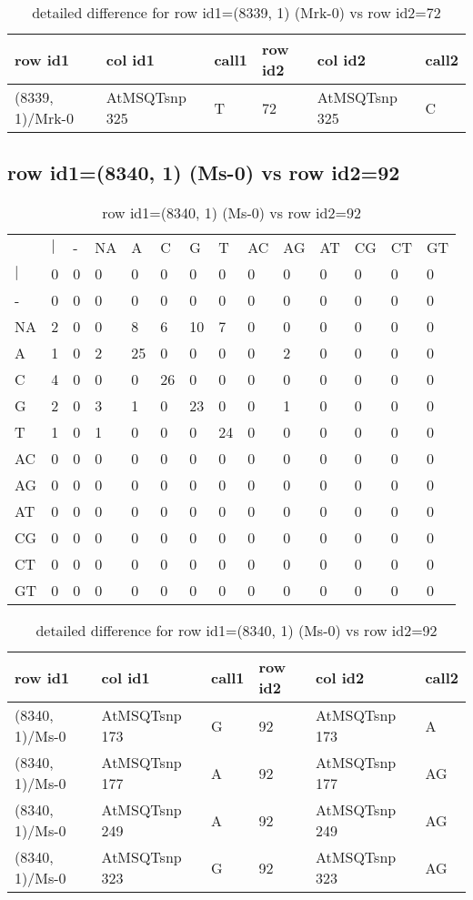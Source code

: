 \begin{center}
\begin{longtable}{|l|l|l|l|l|l|}
\caption{detailed difference for row id1=(8339, 1) (Mrk-0) vs row id2=72} \label{table_dm351}\\
\hline
row id1&col id1&call1&row id2&col id2&call2\\
\hline
(8339, 1)/Mrk-0&AtMSQTsnp 325&T&72&AtMSQTsnp 325&C\\
\hline
\end{longtable}
\end{center}

\subsection{row id1=(8340, 1) (Ms-0) vs row id2=92}
\begin{center}
\begin{longtable}{|l|l|l|l|l|l|l|l|l|l|l|l|l|l|}
\caption{row id1=(8340, 1) (Ms-0) vs row id2=92} \label{table_dm352}\\
\hline
\\
\hline
&$|$&-&NA&A&C&G&T&AC&AG&AT&CG&CT&GT\\
$|$&0&0&0&0&0&0&0&0&0&0&0&0&0\\
-&0&0&0&0&0&0&0&0&0&0&0&0&0\\
NA&2&0&0&8&6&10&7&0&0&0&0&0&0\\
A&1&0&2&25&0&0&0&0&2&0&0&0&0\\
C&4&0&0&0&26&0&0&0&0&0&0&0&0\\
G&2&0&3&1&0&23&0&0&1&0&0&0&0\\
T&1&0&1&0&0&0&24&0&0&0&0&0&0\\
AC&0&0&0&0&0&0&0&0&0&0&0&0&0\\
AG&0&0&0&0&0&0&0&0&0&0&0&0&0\\
AT&0&0&0&0&0&0&0&0&0&0&0&0&0\\
CG&0&0&0&0&0&0&0&0&0&0&0&0&0\\
CT&0&0&0&0&0&0&0&0&0&0&0&0&0\\
GT&0&0&0&0&0&0&0&0&0&0&0&0&0\\
\hline
\end{longtable}
\end{center}

\begin{center}
\begin{longtable}{|l|l|l|l|l|l|}
\caption{detailed difference for row id1=(8340, 1) (Ms-0) vs row id2=92} \label{table_dm353}\\
\hline
row id1&col id1&call1&row id2&col id2&call2\\
\hline
(8340, 1)/Ms-0&AtMSQTsnp 173&G&92&AtMSQTsnp 173&A\\
(8340, 1)/Ms-0&AtMSQTsnp 177&A&92&AtMSQTsnp 177&AG\\
(8340, 1)/Ms-0&AtMSQTsnp 249&A&92&AtMSQTsnp 249&AG\\
(8340, 1)/Ms-0&AtMSQTsnp 323&G&92&AtMSQTsnp 323&AG\\
\hline
\end{longtable}
\end{center}


